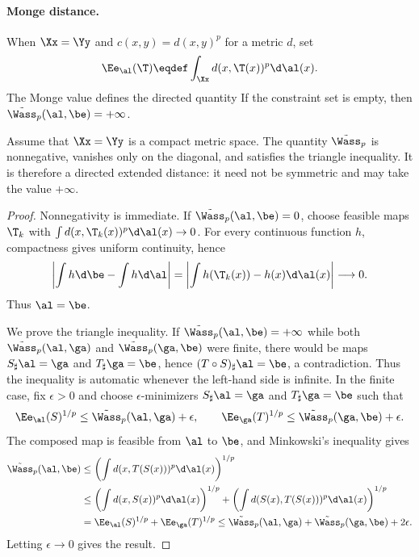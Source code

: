 \paragraph{Monge distance.}

When $\Xx=\Yy$ and $c(x,y)=d(x,y)^p$ for a metric $d$, set
\[
	\Ee_\al(\T)
	\eqdef
	\int_\Xx d(x,\T(x))^p\d\al(x).
\]
The Monge value defines the directed quantity
If the constraint set is empty, then $\tilde\Wass_p(\al,\be)=+\infty$.

\begin{prop}\label{prop-directed-monge-distance}
	Assume that $\Xx=\Yy$ is a compact metric space. The quantity $\tilde\Wass_p$ is nonnegative, vanishes only on the diagonal, and satisfies the triangle inequality. It is therefore a directed extended distance: it need not be symmetric and may take the value $+\infty$.
\end{prop}
\begin{proof}
	Nonnegativity is immediate. If $\tilde\Wass_p(\al,\be)=0$, choose feasible maps $\T_k$ with $\int d(x,\T_k(x))^p\d\al(x)\to0$. For every continuous function $h$, compactness gives uniform continuity, hence
	\[
		\left|\int h\d\be-\int h\d\al\right|
		=
		\left|\int h(\T_k(x))-h(x)\d\al(x)\right|
		\longrightarrow0.
	\]
	Thus $\al=\be$.

	We prove the triangle inequality. If $\tilde\Wass_p(\al,\be)=+\infty$ while both $\tilde\Wass_p(\al,\ga)$ and $\tilde\Wass_p(\ga,\be)$ were finite, there would be maps $S_\sharp\al=\ga$ and $T_\sharp\ga=\be$, hence $(T\circ S)_\sharp\al=\be$, a contradiction. Thus the inequality is automatic whenever the left-hand side is infinite. In the finite case, fix $\epsilon>0$ and choose $\epsilon$-minimizers $S_\sharp\al=\ga$ and $T_\sharp\ga=\be$ such that
	\[
		\Ee_\al(S)^{1/p}\leq\tilde\Wass_p(\al,\ga)+\epsilon,
		\qquad
		\Ee_\ga(T)^{1/p}\leq\tilde\Wass_p(\ga,\be)+\epsilon.
	\]
	The composed map is feasible from $\al$ to $\be$, and Minkowski's inequality gives
	\[
	\begin{aligned}
		\tilde\Wass_p(\al,\be)
		&\leq
		\left(\int d(x,T(S(x)))^p\d\al(x)\right)^{1/p} \\
		&\leq
		\left(\int d(x,S(x))^p\d\al(x)\right)^{1/p}
		+
		\left(\int d(S(x),T(S(x)))^p\d\al(x)\right)^{1/p} \\
		&=
		\Ee_\al(S)^{1/p}+\Ee_\ga(T)^{1/p}
		\leq
		\tilde\Wass_p(\al,\ga)+\tilde\Wass_p(\ga,\be)+2\epsilon.
	\end{aligned}
	\]
	Letting $\epsilon\to0$ gives the result.
\end{proof}

